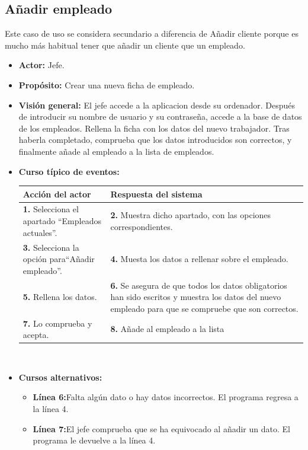 \documentclass[spanish,a4paper,11pt, twoside]{report}	%
\begin{document}

	\subsection{Añadir empleado}	
	Este caso de uso se considera secundario a diferencia de Añadir cliente porque es mucho más habitual tener que añadir un cliente que un empleado.
			\begin{itemize}
			\item \textbf{Actor:} Jefe.
			\item \textbf{Propósito:} Crear una nueva ficha de empleado.
			\item \textbf{Visión general:} El jefe accede a la aplicacion desde su
				ordenador. Después de introducir su nombre de usuario y su contraseña, accede a
				la base de datos de los empleados. Rellena la ficha con los datos del nuevo
				trabajador. Tras haberla completado, comprueba que los datos introducidos son
				correctos, y finalmente añade al empleado a la lista de empleados.
			\item \textbf{Curso típico de eventos:} 	\\
				\begin{tabular}{|p{6cm}||p{6cm}|}
				\hline
				\textbf{Acción del actor} & \textbf{Respuesta del sistema} \\ \hline \hline
				\textbf{1.} Selecciona el apartado ``Empleados actuales''. & 
				\textbf{2.} Muestra dicho apartado, con las opciones correspondientes. \\ \hline
				\textbf{3.} Selecciona la opción para``Añadir empleado''.	& 
				\textbf{4.} Muesta los datos a rellenar sobre el empleado. \\ \hline
				\textbf{5.} Rellena los datos. & 
				\textbf{6.} Se asegura de que todos los datos obligatorios han sido escritos y
					muestra los datos del nuevo empleado para que se compruebe que son correctos.\\ \hline
				\textbf{7.} Lo comprueba y acepta. & 
				\textbf{8. }Añade al empleado a la lista \\ \hline
			\end{tabular}
			\\
			\item \textbf{Cursos alternativos:} 
			\begin{itemize}
			\item  \textbf{Línea 6:}Falta algún dato o hay datos incorrectos. El programa regresa a la línea 4.
			\item  \textbf{Línea 7:}El jefe comprueba que se ha equivocado al añadir un dato. 
				El programa le devuelve a la línea 4.
			\end {itemize}
		\end{itemize}
\end{document}
